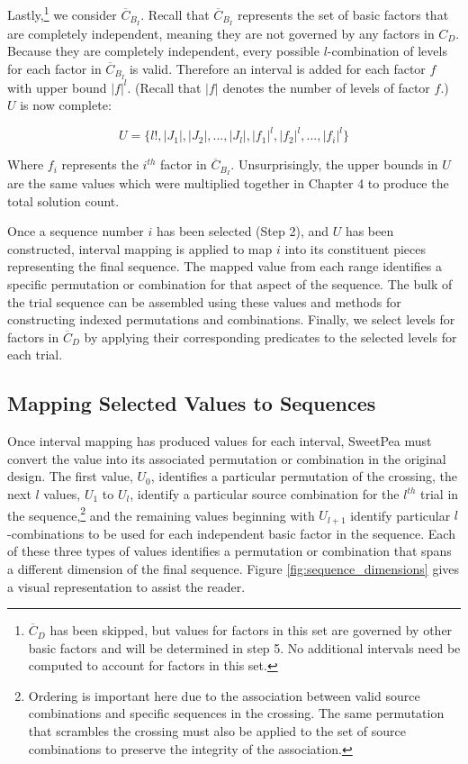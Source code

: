 Lastly,\footnote{$\overline{C}_D$ has been skipped, but values for factors in this set are governed by other basic factors and will be determined in step 5. No additional intervals need be computed to account for factors in this set.} we consider $\overline{C}_{B_I}$. Recall that $\overline{C}_{B_I}$ represents the set of basic factors that are completely independent, meaning they are not governed by any factors in $C_D$. Because they are completely independent, every possible $l$-combination of levels for each factor in $\overline{C}_{B_I}$ is valid. Therefore an interval is added for each factor $f$ with upper bound $|f|^l$. (Recall that $|f|$ denotes the number of levels of factor $f$.) $U$ is now complete:

\[
U = \{ l!, |J_1|, |J_2|, ..., |J_l|, |f_1|^l, |f_2|^l, ..., |f_i|^l\}
\]

Where $f_i$ represents the $i^{th}$ factor in $\overline{C}_{B_I}$. Unsurprisingly, the upper bounds in $U$ are the same values which were multiplied together in Chapter 4 to produce the total solution count.

Once a sequence number $i$ has been selected (Step 2), and $U$ has been constructed, interval mapping is applied to map $i$ into its constituent pieces representing the final sequence. The mapped value from each range identifies a specific permutation or combination for that aspect of the sequence. The bulk of the trial sequence can be assembled using these values and methods for constructing indexed permutations and combinations. Finally, we select levels for factors in $\overline{C}_D$ by applying their corresponding predicates to the selected levels for each trial.


\subsection{Mapping Selected Values to Sequences}

Once interval mapping has produced values for each interval, SweetPea must convert the value into its associated permutation or combination in the original design. The first value, $U_0$, identifies a particular permutation of the crossing, the next $l$ values, $U_1$ to $U_l$, identify a particular source combination for the $l^{th}$ trial in the sequence,\footnote{Ordering is important here due to the association between valid source combinations and specific sequences in the crossing. The same permutation that scrambles the crossing must also be applied to the set of source combinations to preserve the integrity of the association.} and the remaining values beginning with $U_{l+1}$ identify particular $l$-combinations to be used for each independent basic factor in the sequence. Each of these three types of values identifies a permutation or combination that spans a different dimension of the final sequence. Figure \ref{fig:sequence_dimensions} gives a visual representation to assist the reader.

